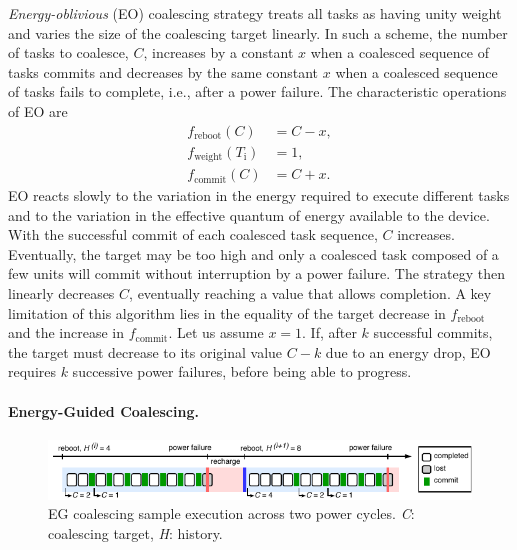 {\em Energy-oblivious} (EO) coalescing strategy treats all tasks as having unity weight and varies the size of the coalescing target linearly. In such a scheme, the number of tasks to coalesce, $C$, increases by a constant $x$ when a coalesced sequence of tasks commits and decreases by the same constant $x$ when a coalesced sequence of tasks fails to complete, i.e., after a power failure. The characteristic operations of EO are
%
\begin{equation}
	\begin{split}
		f_\text{reboot}(C) & = C - x, \\
		f_\text{weight}(T_\text{i}) & =  1, \\
		f_\text{commit}(C) & = C + x.
	\end{split}
	\label{eq:eo}
\end{equation}
%
EO reacts slowly to the variation in the energy required to execute different tasks and to the variation in the effective quantum of energy available to the device. With the successful commit of each coalesced task sequence, $C$ increases. Eventually, the target may be too high and only a coalesced task composed of a few units will commit without interruption by a power failure. The strategy then linearly decreases $C$, eventually reaching a value that allows completion. A key limitation of this algorithm lies in the equality of the target decrease in $f_\text{reboot}$ and the increase in $f_\text{commit}$. Let us assume $x=1$. If, after $k$ successful commits, the target must decrease to its original value $C-k$ due to an energy drop, EO requires $k$ successive power failures, before being able to progress.

\paragraph{Energy-Guided Coalescing.}
\label{subsec:energyAware}

\begin{figure}
    \includegraphics[width=\linewidth]{figures/hg-coal-horiz.pdf}
    \caption{EG coalescing sample execution across two power cycles. \emph{C}: coalescing target, \emph{H}: history.}
    \label{fig:hg-coal}
\end{figure}

